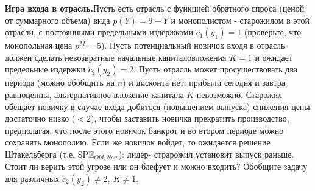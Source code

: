 \documentclass[a4paper,12pt]{article}
\begin{document}
\begin{exmp}
{\bf Игра входа в отрасль.}\rm Пусть есть отрасль с
функцией обратного спроса (ценой от суммарного объема) вида
$p(Y)=9-Y$ и монополистом - старожилом в этой отрасли, с
постоянными предельными издержками $\dot{c}_1(y_1)=1$
(проверьте, что монопольная цена $p^M=5$). Пусть
потенциальный новичок входя в отрасль должен сделать
невозвратные начальные капиталовложения $K=1$ и ожидает
предельные издержки $\dot{c}_2(y_2)=2$. Пусть отрасль может
просуществовать два периода (можно обобщить на $n$) и
дисконта нет: прибыли сегодня и завтра равноценны,
альтернативное вложение капитала $K$ невозможно. Старожил
обещает новичку в случае входа добиться (повышением
выпуска) снижения цены достаточно низко ($<2$), чтобы
заставить новичка прекратить производство, предполагая, что
после этого новичок банкрот и во втором периоде можно
сохранять монополию. Если же новичок войдет, то ожидается
решение Штакельберга (т.е. SPE$_{Old,New}$): лидер-
страрожил установит выпуск раньше. Стоит ли верить этой
угрозе или он блефует и можно входить? Обобщите задачу для
различных $\dot{c}_2(y_2)\neq 2, ~K\neq 1$.
\end{exmp}
\end{document}
